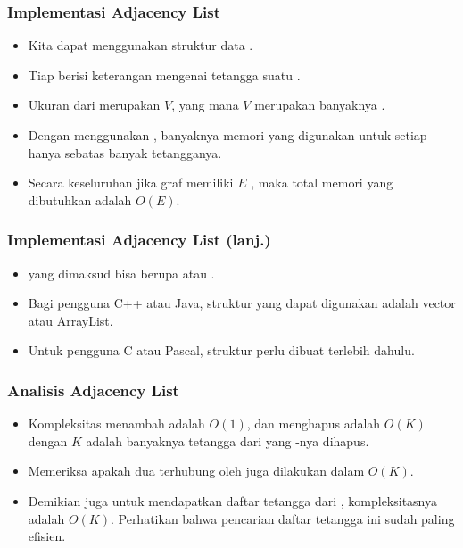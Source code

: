 \begin{frame}
\frametitle{Implementasi Adjacency List}
\begin{itemize}
  \item Kita dapat menggunakan struktur data .
  \item Tiap \flist berisi keterangan mengenai tetangga suatu \fnode.
  \item Ukuran dari \farray merupakan $V$, yang mana $V$ merupakan banyaknya \fnode.
  \item Dengan menggunakan \flist, banyaknya memori yang digunakan untuk setiap \fnode hanya sebatas banyak tetangganya.
  \item Secara keseluruhan jika graf memiliki $E$ \fedge, maka total memori yang dibutuhkan adalah $O(E)$.
\end{itemize}
\end{frame}

\begin{frame}
\frametitle{Implementasi Adjacency List (lanj.)}
\begin{itemize}
  \item \fList yang dimaksud bisa berupa  atau .
  \item Bagi pengguna C++ atau Java, struktur \flist yang dapat digunakan adalah vector atau ArrayList.
  \item Untuk pengguna C atau Pascal, struktur  perlu dibuat terlebih dahulu.
\end{itemize}
\end{frame}

\begin{frame}
\frametitle{Analisis Adjacency List}
\begin{itemize}
  \item Kompleksitas menambah \fedge adalah $O(1)$, dan menghapus adalah $O(K)$ dengan $K$ adalah banyaknya tetangga dari \fnode yang \fedge-nya dihapus.
  \item Memeriksa apakah dua \fnode terhubung oleh \fedge juga dilakukan dalam $O(K)$.
  \item Demikian juga untuk mendapatkan daftar tetangga dari \fnode, kompleksitasnya adalah $O(K)$. Perhatikan bahwa pencarian daftar tetangga ini sudah paling efisien.
\end{itemize}
\end{frame}

